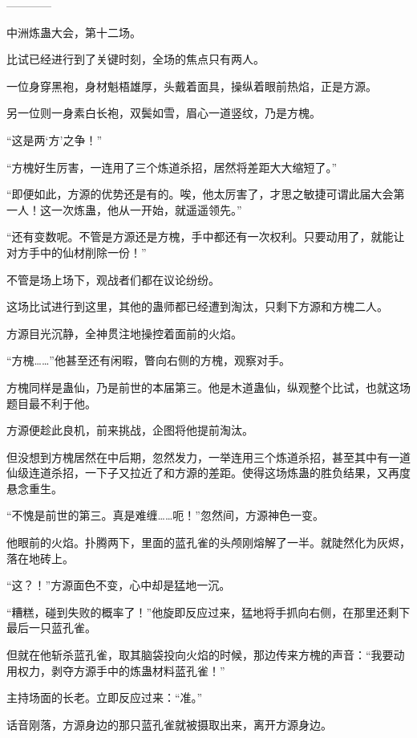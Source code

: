 
\begin{this_body}

------------

中洲炼蛊大会，第十二场。

比试已经进行到了关键时刻，全场的焦点只有两人。

一位身穿黑袍，身材魁梧雄厚，头戴着面具，操纵着眼前热焰，正是方源。

另一位则一身素白长袍，双鬓如雪，眉心一道竖纹，乃是方槐。

“这是两‘方’之争！”

“方槐好生厉害，一连用了三个炼道杀招，居然将差距大大缩短了。”

“即便如此，方源的优势还是有的。唉，他太厉害了，才思之敏捷可谓此届大会第一人！这一次炼蛊，他从一开始，就遥遥领先。”

“还有变数呢。不管是方源还是方槐，手中都还有一次权利。只要动用了，就能让对方手中的仙材削除一份！”

不管是场上场下，观战者们都在议论纷纷。

这场比试进行到这里，其他的蛊师都已经遭到淘汰，只剩下方源和方槐二人。

方源目光沉静，全神贯注地操控着面前的火焰。

“方槐……”他甚至还有闲暇，瞥向右侧的方槐，观察对手。

方槐同样是蛊仙，乃是前世的本届第三。他是木道蛊仙，纵观整个比试，也就这场题目最不利于他。

方源便趁此良机，前来挑战，企图将他提前淘汰。

但没想到方槐居然在中后期，忽然发力，一举连用三个炼道杀招，甚至其中有一道仙级连道杀招，一下子又拉近了和方源的差距。使得这场炼蛊的胜负结果，又再度悬念重生。

“不愧是前世的第三。真是难缠……呃！”忽然间，方源神色一变。

他眼前的火焰。扑腾两下，里面的蓝孔雀的头颅刚熔解了一半。就陡然化为灰烬，落在地砖上。

“这？！”方源面色不变，心中却是猛地一沉。

“糟糕，碰到失败的概率了！”他旋即反应过来，猛地将手抓向右侧，在那里还剩下最后一只蓝孔雀。

但就在他斩杀蓝孔雀，取其脑袋投向火焰的时候，那边传来方槐的声音：“我要动用权力，剥夺方源手中的炼蛊材料蓝孔雀！”

主持场面的长老。立即反应过来：“准。”

话音刚落，方源身边的那只蓝孔雀就被摄取出来，离开方源身边。


\end{this_body}
